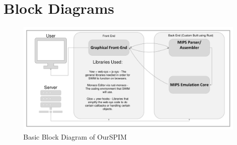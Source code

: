 \documentclass[parskip=half, fontsize=12pt]{scrartcl}
\begin{document}
\section{Block Diagrams}
\begin{figure}[H]
    \centering
    \includegraphics[width=\textwidth]{block-diagram}
    \caption{Basic Block Diagram of OurSPIM}
\end{figure}
\end{document}
